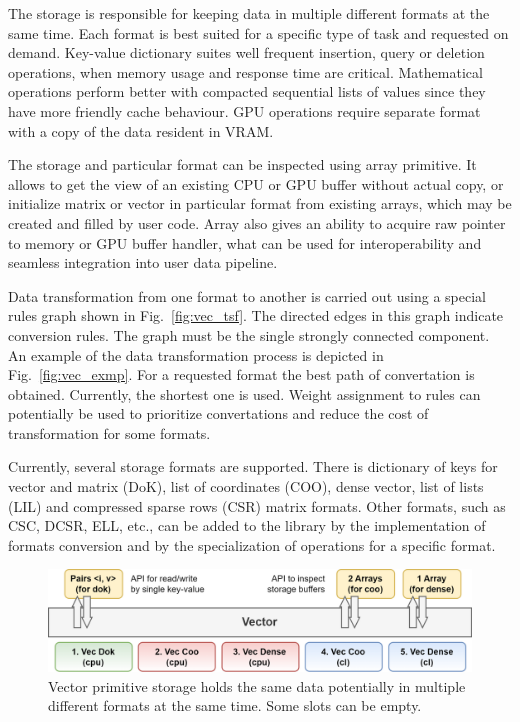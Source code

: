 The storage is responsible for keeping data in multiple different formats at the same time. 
Each format is best suited for a specific type of task and requested on demand. 
Key-value dictionary suites well frequent insertion, query or deletion operations, when memory usage and response time are critical. 
Mathematical operations perform better with compacted sequential lists of values since they have more friendly cache behaviour. 
GPU operations require separate format with a copy of the data resident in VRAM.

The storage and particular format can be inspected using array primitive. It allows to get the view of an existing CPU or GPU buffer without actual copy, or initialize matrix or vector in particular format from existing arrays, which may be created and filled by user code. Array also gives an ability to acquire raw pointer to memory or GPU buffer handler, what can be used for interoperability and seamless integration into user data pipeline.

Data transformation from one format to another is carried out using a special rules graph shown in Fig.~\ref{fig:vec_tsf}. 
The directed edges in this graph indicate conversion rules. 
The graph must be the single strongly connected component. 
An example of the data transformation process is depicted in Fig.~\ref{fig:vec_exmp}. 
For a requested format the best path of convertation is obtained. Currently, the shortest one is used. 
Weight assignment to rules can potentially be used to prioritize convertations and reduce the cost of transformation for some formats. 

Currently, several storage formats are supported. 
There is dictionary of keys for vector and matrix (DoK), list of coordinates (COO), dense vector, list of lists (LIL) and compressed sparse rows (CSR) matrix formats.  
Other formats, such as CSC, DCSR, ELL, etc., can be added to the library by the implementation of formats conversion and by the specialization of operations for a specific format. 

\begin{figure}[b]
\centering
\includegraphics[width=0.8\linewidth]{figures/vector_storage.png}
\caption{Vector primitive storage holds the same data potentially in multiple different formats at the same time. Some slots can be empty.}
\label{fig:vec_storage}
\end{figure}

